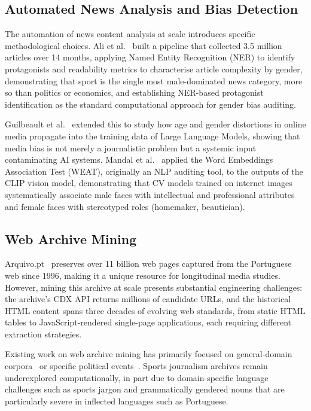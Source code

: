 \documentclass[11pt,a4paper]{article}
\begin{document}
\subsection{Automated News Analysis and Bias Detection}

The automation of news content analysis at scale introduces specific methodological choices. Ali et al.~\cite{Ali2010} built a pipeline that collected 3.5 million articles over 14 months, applying Named Entity Recognition (NER) to identify protagonists and readability metrics to characterise article complexity by gender, demonstrating that sport is the single most male-dominated news category, more so than politics or economics, and establishing NER-based protagonist identification as the standard computational approach for gender bias auditing.

Guilbeault et al.~\cite{Guilbeault2025} extended this to study how age and gender distortions in online media propagate into the training data of Large Language Models, showing that media bias is not merely a journalistic problem but a systemic input contaminating AI systems. Mandal et al.~\cite{Mandal2023} applied the Word Embeddings Association Test (WEAT), originally an NLP auditing tool, to the outputs of the CLIP vision model, demonstrating that CV models trained on internet images systematically associate male faces with intellectual and professional attributes and female faces with stereotyped roles (homemaker, beautician).

\subsection{Web Archive Mining}

Arquivo.pt~\cite{Arquivo} preserves over 11 billion web pages captured from the Portuguese web since 1996, making it a unique resource for longitudinal media studies. However, mining this archive at scale presents substantial engineering challenges: the archive's CDX API returns millions of candidate URLs, and the historical HTML content spans three decades of evolving web standards, from static HTML tables to JavaScript-rendered single-page applications, each requiring different extraction strategies.

Existing work on web archive mining has primarily focused on general-domain corpora~\cite{AlSum2014} or specific political events~\cite{Gossen2015}. Sports journalism archives remain underexplored computationally, in part due to domain-specific language challenges such as sports jargon and grammatically gendered nouns that are particularly severe in inflected languages such as Portuguese.
\end{document}
